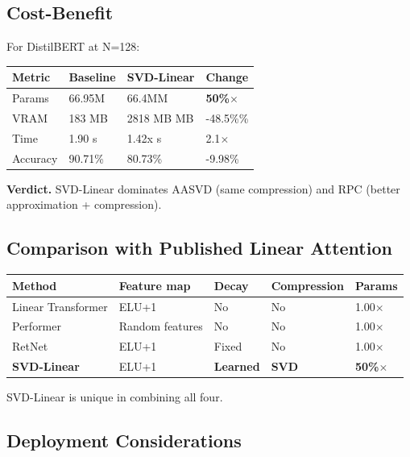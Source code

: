 \subsection{Cost-Benefit}

For DistilBERT at N=128:

\begin{table}[H]
\centering
\small
\begin{tabular}{llll}
\toprule
\textbf{Metric} & \textbf{Baseline} & \textbf{SVD-Linear} & \textbf{Change} \\
\midrule
Params & 66.95M & 66.4MM & \textbf{50\%$\times$} \\
VRAM & 183 MB & 2818 MB MB & -48.5\%\% \\
Time & 1.90 s & 1.42x s & 2.1$\times$ \\
Accuracy & 90.71\% & 80.73\% & -9.98\% \\
\bottomrule
\end{tabular}
\end{table}

\textbf{Verdict.} SVD-Linear dominates AASVD (same compression) and RPC (better 
approximation + compression).

\subsection{Comparison with Published Linear Attention}

\begin{table}[H]
\centering
\small
\begin{tabular}{lllll}
\toprule
\textbf{Method} & \textbf{Feature map} & \textbf{Decay} & \textbf{Compression} & \textbf{Params} \\
\midrule
Linear Transformer & ELU+1 & No & No & 1.00$\times$ \\
Performer & Random features & No & No & 1.00$\times$ \\
RetNet & ELU+1 & Fixed & No & 1.00$\times$ \\
\textbf{SVD-Linear} & ELU+1 & \textbf{Learned} & \textbf{SVD} & \textbf{50\%$\times$} \\
\bottomrule
\end{tabular}
\end{table}

SVD-Linear is unique in combining all four.

\subsection{Deployment Considerations}

